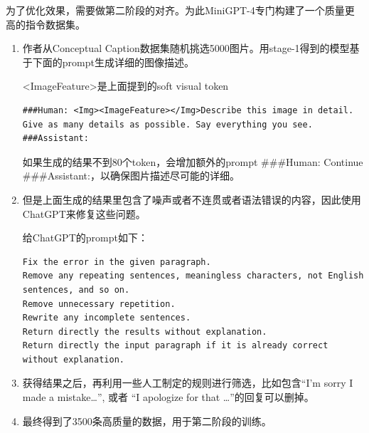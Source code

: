 \documentclass[zihao=false,fontset=windows]{ctexart}
\begin{document}
\par\vspace{0.95em}\par\vspace{0.28em}

为了优化效果，需要做第二阶段的对齐。为此MiniGPT-4专门构建了一个质量更高的指令数据集。\par

\begin{enumerate}
\item 作者从Conceptual Caption数据集随机挑选5000图片。用stage-1得到的模型基于下面的prompt生成详细的图像描述。\par
<ImageFeature>是上面提到的soft visual token\par

\begin{feishucode}
\begin{lstlisting}[language={}]
###Human: <Img><ImageFeature></Img>Describe this image in detail. Give as many details as possible. Say everything you see. ###Assistant:
\end{lstlisting}
\end{feishucode}

如果生成的结果不到80个token，会增加额外的prompt \#\#\#Human: Continue \#\#\#Assistant:，以确保图片描述尽可能的详细。\par

\item 但是上面生成的结果里包含了噪声或者不连贯或者语法错误的内容，因此使用ChatGPT来修复这些问题。\par
给ChatGPT的prompt如下：\par

\begin{feishucode}
\begin{lstlisting}[language={}]
Fix the error in the given paragraph. 
Remove any repeating sentences, meaningless characters, not English sentences, and so on. 
Remove unnecessary repetition. 
Rewrite any incomplete sentences.
Return directly the results without explanation. 
Return directly the input paragraph if it is already correct without explanation.
\end{lstlisting}
\end{feishucode}

\item 获得结果之后，再利用一些人工制定的规则进行筛选，比如包含“I’m sorry I made a mistake…”, 或者 “I apologize for that …”的回复可以删掉。\par
\item 最终得到了3500条高质量的数据，用于第二阶段的训练。\par
\end{enumerate}
\end{document}
